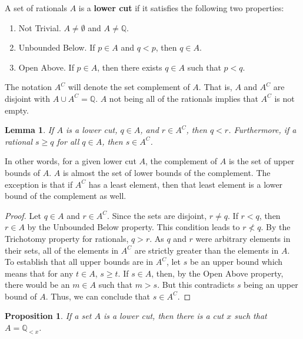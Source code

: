 \documentclass[12pt]{article}
\newtheorem{lemma}{Lemma}[section]
\newtheorem{proposition}{Proposition}[section]
\newcommand{\qcut}[2][x]{\ensuremath{\mathbb{Q}_{#2 #1}}}
\newcommand{\qlt}[1][x]{\qcut[#1]{<}}
\begin{document}
A set of rationals $A$ is a \textbf{lower cut} if it satisfies the following two properties: 
\begin{enumerate}
    \item Not Trivial. $A \neq \emptyset$ and $A \neq \mathbb{Q}$.
    \item Unbounded Below. If $p \in A$ and $q < p$, then $q \in A$. 
    \item Open Above. If $p \in A$, then there exists $q \in A$ such that $p < q$.
\end{enumerate}
The notation $A^C$ will denote the set complement of $A$. That is, $A$ and $A^C$ are disjoint with $A \cup A^C = \mathbb{Q}$. $A$ not being all of the rationals implies that $A^C$ is not empty. 

\begin{lemma}
    If $A$ is a lower cut, $q \in A$, and $r \in A^C$, then $q < r$. Furthermore, if a rational $s \geq q$ for all $q \in A$, then $s \in A^C$.
\end{lemma}

In other words, for a given lower cut $A$, the complement of $A$ is the set of upper bounds of $A$.  $A$ is almost the set of lower bounds of the complement. The exception is that if $A^C$ has a least element, then that least element is a lower bound of the complement as well. 

\begin{proof}
    Let $q \in A$ and $r \in A^C$. Since the sets are disjoint, $r \neq q$. If $r < q$, then $r \in A$ by the Unbounded Below property. This condition leads to $r \nless q$. By the Trichotomy property for rationals, $q > r$. As $q$ and $r$ were arbitrary elements in their sets, all of the elements in $A^C$ are strictly greater than the elements in $A$. To establish that all upper bounds are in $A^C$, let $s$ be an upper bound which means that for any $t \in A$, $s \geq t$. If $s \in A$, then, by the Open Above property, there would be an $m \in A$ such that $m > s$. But this contradicts $s$ being an upper bound of $A$. Thus, we can conclude that $s \in A^C$. 
\end{proof}


\begin{proposition}
    If a set $A$ is a lower cut, then there is a cut $x$ such that $A = \qlt$.
\end{proposition}
\end{document}
